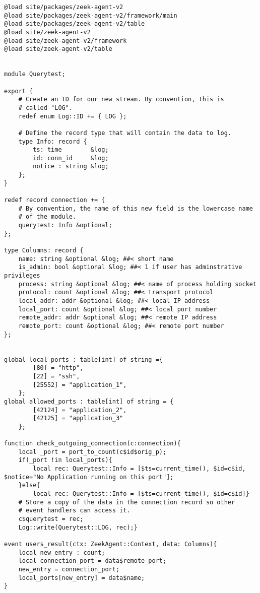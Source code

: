 \begin{lstlisting}[caption={Abfrage und Abgleich der Ports },label={Code_4},consecutivenumbers=false,lastline=77,firstnumber=52,numberblanklines=false,linerange={52-55,62-70,76-77}]
@load site/packages/zeek-agent-v2
@load site/packages/zeek-agent-v2/framework/main
@load site/packages/zeek-agent-v2/table
@load site/zeek-agent-v2
@load site/zeek-agent-v2/framework
@load site/zeek-agent-v2/table


module Querytest;

export {
    # Create an ID for our new stream. By convention, this is
    # called "LOG".
    redef enum Log::ID += { LOG };

    # Define the record type that will contain the data to log.
    type Info: record {
        ts: time        &log;
        id: conn_id     &log; 
        notice : string &log;
    };
}

redef record connection += {
    # By convention, the name of this new field is the lowercase name
    # of the module.
    querytest: Info &optional;
};

type Columns: record {
    name: string &optional &log; ##< short name
    is_admin: bool &optional &log; ##< 1 if user has adminstrative privileges
    process: string &optional &log; ##< name of process holding socket
    protocol: count &optional &log; ##< transport protocol
    local_addr: addr &optional &log; ##< local IP address
    local_port: count &optional &log; ##< local port number
    remote_addr: addr &optional &log; ##< remote IP address
    remote_port: count &optional &log; ##< remote port number
};


global local_ports : table[int] of string ={
        [80] = "http",
        [22] = "ssh",
        [25552] = "application_1",
    };
global allowed_ports : table[int] of string = {
        [42124] = "application_2",
        [42125] = "application_3" 
    };

function check_outgoing_connection(c:connection){
    local _port = port_to_count(c$id$orig_p);
    if(_port !in local_ports){
        local rec: Querytest::Info = [$ts=current_time(), $id=c$id, $notice="No Application running on this port"];
    }else{
    	local rec: Querytest::Info = [$ts=current_time(), $id=c$id]}
    # Store a copy of the data in the connection record so other
    # event handlers can access it.
    c$querytest = rec;
    Log::write(Querytest::LOG, rec);}

event users_result(ctx: ZeekAgent::Context, data: Columns){
    local new_entry : count;
    local connection_port = data$remote_port;
    new_entry = connection_port;
    local_ports[new_entry] = data$name;
}



\end{lstlisting}
